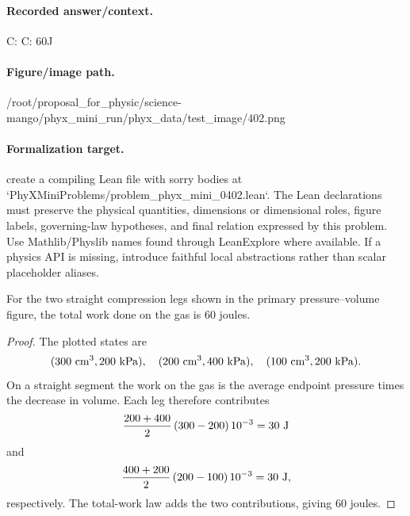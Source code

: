 \paragraph{Recorded answer/context.}
C: C: 60J

\paragraph{Figure/image path.}
/root/proposal\_for\_physic/science-mango/phyx\_mini\_run/phyx\_data/test\_image/402.png

\paragraph{Formalization target.}
create a compiling Lean file with sorry bodies at `PhyXMiniProblems/problem\_phyx\_mini\_0402.lean`. The Lean declarations must preserve the physical quantities, dimensions or dimensional roles, figure labels, governing-law hypotheses, and final relation expressed by this problem.
Use Mathlib/Physlib names found through LeanExplore where available. If a physics API is missing, introduce faithful local abstractions rather than scalar placeholder aliases.

\begin{theorem}
\label{thm:physics:phyx_mini_0402:target}
For the two straight compression legs shown in the primary pressure--volume
figure, the total work done on the gas is \(60\) joules.
\end{theorem}
\begin{proof}
The plotted states are
\[
 (300\ {\rm cm^3},200\ {\rm kPa}),\quad
 (200\ {\rm cm^3},400\ {\rm kPa}),\quad
 (100\ {\rm cm^3},200\ {\rm kPa}).
\]
On a straight segment the work on the gas is the average endpoint pressure
times the decrease in volume.  Each leg therefore contributes
\[
 \frac{200+400}{2}\,(300-200)\,10^{-3}=30\ {\rm J}
\]
and
\[
 \frac{400+200}{2}\,(200-100)\,10^{-3}=30\ {\rm J},
\]
respectively.  The total-work law adds the two contributions, giving
\(60\) joules.
\end{proof}


